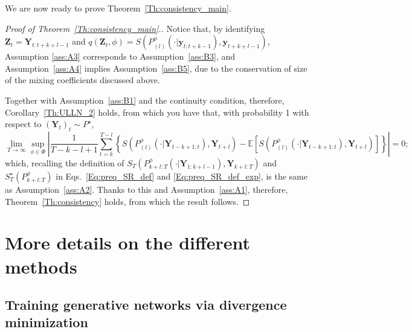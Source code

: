 \documentclass[twoside,11pt]{article}
\newcommand{\E}{\mathbb{E}}
\newcommand{\ddobs}{\mathbf{y}}
\newcommand{\Ddobs}{\mathbf{Y}}
\newcommand{\Ddz}{\mathbf{Z}}
\newcommand{\Ddobsupkplusl}{\mathbf{Y}_{1:k+l-1}}
\newcommand{\DdobsupTfromk}{\mathbf{Y}_{k+l:T}}
\begin{document}
	
	We are now ready to prove Theorem~\ref{Th:consistency_main}.
	
	\begin{proof}[Proof of Theorem~\ref{Th:consistency_main}.]
		
		Notice that, by identifying $  \Ddz_t = \Ddobs_{t:t+k+l-1} $ and $ q(\Ddz_t, \phi) = S(P^\phi_{(l)}(\cdot|\ddobs_{t:t+k-1}), \ddobs_{t+k+l-1}) $, Assumption \ref{ass:A3} corresponds to Assumption~\ref{ass:B3}, and Assumption~\ref{ass:A4} implies Assumption~\ref{ass:B5}, due to the conservation of size of the mixing coefficients discussed above.	
		
		Together with Assumption~\ref{ass:B1} and the continuity condition, therefore, Corollary~\ref{Th:ULLN_2} holds, from which you have that, 
		with probability 1 with respect to $ (\Ddobs_t)_t\sim P^\star$,
		\begin{equation}\label{}
		\lim_{T\to\infty} \sup_{\phi \in \Phi} \left|\frac{1}{T-k-l+1} \sum_{t=k}^{T-l} \left\{ S(P^\phi_{(l)}(\cdot|\Ddobs_{t-k+1:t}), \Ddobs_{t+l}) - \E\left[ S(P^\phi_{(l)}(\cdot|\Ddobs_{t-k+1:t}), \Ddobs_{t+l}) \right] \right\} \right| = 0;
		\end{equation}
		which, recalling the definition of $ S_T(P_{k+l:T}^\phi(\cdot|\Ddobsupkplusl), \DdobsupTfromk) $ and $ S_T^\star(P_{k+l:T}^\phi) $ in Eqs.~\eqref{Eq:preq_SR_def} and \eqref{Eq:preq_SR_def_exp}, is the same as Assumption~\ref{ass:A2}. Thanks to this and Assumption~\ref{ass:A1}, therefore, Theorem~\ref{Th:consistency} holds, from which the result follows.
	\end{proof}
	
	
	
	
	
	
	
	
	
	\section{More details on the different methods}\label{app:more_details}
	
	\subsection{Training generative networks via divergence minimization}\label{app:GAN}
	
	
\end{document}
